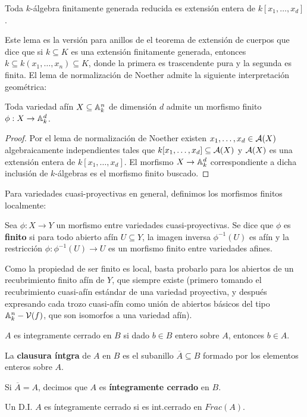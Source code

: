 \documentclass[ACGA.tex]{subfiles}
\begin{document}
\begin{lemma} Toda $k$-álgebra finitamente generada reducida es extensión entera de $k[x_1,\dots,x_d]$. 
\end{lemma}

Este lema es la versión para anillos de el teorema de extensión de cuerpos que dice que si $k\subseteq K$ es una extensión finitamente generada, entonces $k\subseteq k(x_1,\dots,x_n)\subseteq K$, donde la primera es trascendente pura y la segunda es finita.
El lema de normalización de Noether admite la siguiente interpretación geométrica:

\begin{prop}
 Toda variedad afín $X\subseteq\mathbb{A}^n_k$ de dimensión $d$ admite un morfismo finito $\phi:X\to\mathbb{A}^d_k$.
\end{prop}

\begin{proof}
 Por el lema de normalización de Noether \cite[4.6]{reid} existen $x_1,\ldots,x_d\in\mathcal{A}(X)$ algebraicamente independientes tales que $k[x_1,\ldots,x_d]\subseteq\mathcal{A}(X)$ y $\mathcal{A}(X)$ es una extensión entera de $k[x_1,\ldots,x_d]$. El morfismo $X\to\mathbb{A}^d_k$ correspondiente a dicha inclusión de $k$-álgebras es el morfismo finito buscado.
\end{proof}


Para variedades cuasi-proyectivas en general, definimos los morfismos finitos localmente:

\begin{defi}
 Sea $\phi:X\to Y$ un morfismo entre variedades cuasi-proyectivas. Se dice que $\phi$ es {\bf finito} si para todo abierto afín $U\subseteq Y$, la imagen inversa $\phi^{-1}(U)$ es afín y la restricción $\phi:\phi^{-1}(U)\to U$ es un morfismo finito entre variedades afines. 
\end{defi}

Como la propiedad de ser finito es local, basta probarlo para los abiertos de un recubrimiento finito afín de $Y$, que siempre existe (primero tomando el recubrimiento cuasi-afín estándar de una variedad proyectiva, y después expresando cada trozo cuasi-afín como unión de abiertos básicos del tipo $\mathbb{A}^n_k-\mathcal{V}(f)$, que son isomorfos a una variedad afín). 

\begin{defi}
$A$ es integramente cerrado en $B$ si dado $b \in B$ entero sobre $A$, entonces $b \in A$.
\end{defi}

\begin{defi}
La \textbf{clausura íntgra} de $A$ en $B$ es el subanillo $\overline{A} \subseteq B$ formado por los elementos enteros sobre $A$.

Si $\overline{A} = A$, decimos que $A$ es \textbf{íntegramente cerrado} en $B$.
\end{defi}
\begin{defi}
Un D.I. $A$ es íntegramente cerrado si es int.cerrado en $Frac(A)$.
\end{defi}
\end{document}
